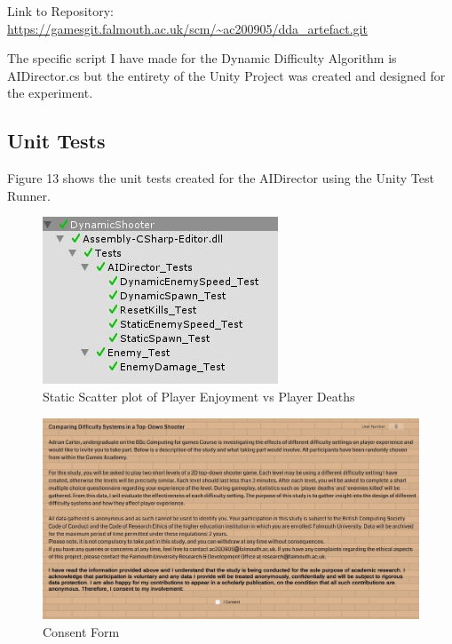 \documentclass[journal]{IEEEtran}
\begin{document}
Link to Repository:
\url{https://gamesgit.falmouth.ac.uk/scm/~ac200905/dda_artefact.git}

The specific script I have made for the Dynamic Difficulty Algorithm is AIDirector.cs but the entirety of the Unity Project was created and designed for the experiment.

\subsection{Unit Tests}
Figure 13 shows the unit tests created for the AIDirector using the Unity Test Runner.

\begin{figure}[h]
	\includegraphics[width=1.0\linewidth]{unittests.jpg}
	\caption{Static Scatter plot of Player Enjoyment vs Player Deaths}
	\label{Analysis Test}
\end{figure}

\begin{figure}[h]
	\includegraphics[width=0.75\linewidth]{consentformingame.jpg}
	\caption{Consent Form}
	\label{Analysis Test}
\end{figure} 
\end{document}
